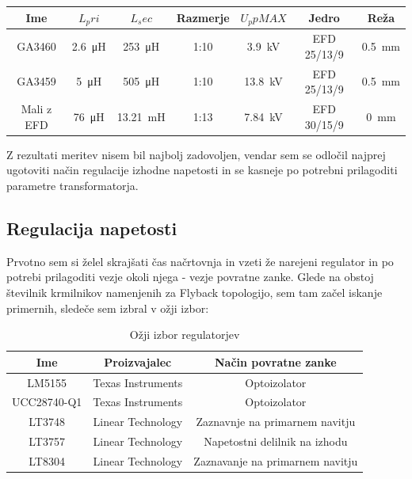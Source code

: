 \documentclass[a4paper,twoside,openright,12pt,slovene]{book}
\begin{document}
\begin{center}
\begin{tabular}{||c|c|c|c|c|c|c||}
\hline
Ime & \(L_pri\) & \(L_sec\) & Razmerje & \(U_ppMAX\) & Jedro & Reža \\ [0.5ex]
\hline\hline
GA3460 & \SI{2.6}{\micro\henry} & \SI{253}{\micro\henry} & 1:10 & \SI{3.9}{\kilo\volt} & EFD 25/13/9 & \SI{0.5}{\milli\meter} \\
\hline
GA3459 & \SI{5}{\micro\henry} & \SI{505}{\micro\henry} & 1:10 & \SI{13.8}{\kilo\volt} & EFD 25/13/9 & \SI{0.5}{\milli\meter} \\
\hline
Mali z EFD & \SI{76}{\micro\henry} & \SI{13.21}{\milli\henry} & 1:13 & \SI{7.84}{\kilo\volt} & EFD 30/15/9 & \SI{0}{\milli\meter} \\
\hline
\end{tabular}

\label{table:1}
\end{center}

Z rezultati meritev nisem bil najbolj zadovoljen, vendar sem se odločil najprej ugotoviti način regulacije izhodne napetosti in se kasneje po potrebni prilagoditi parametre transformatorja. 

	\subsection{Regulacija napetosti} \label{RegulacijaNapetosti}
	Prvotno sem si želel skrajšati čas načrtovnja in vzeti že narejeni regulator in po potrebi prilagoditi vezje okoli njega - vezje povratne zanke. Glede na obstoj številnik krmilnikov namenjenih za Flyback topologijo, sem tam začel iskanje primernih, sledeče sem izbral v ožji izbor:
	
\begin{table}[h!]
\centering
\begin{tabular}{||c | c |c||}
\hline
Ime & Proizvajalec & Način povratne zanke \\[0.5ex]
\hline\hline
LM5155 & Texas Instruments & Optoizolator \\
UCC28740-Q1 & Texas Instruments & Optoizolator \\
LT3748 & Linear Technology & Zaznavnje na primarnem navitju \\
LT3757 & Linear Technology & Napetostni delilnik na izhodu \\
LT8304 & Linear Technology & Zaznavanje na primarnem navitju \\ [1ex]

\hline
\end{tabular}
\caption{Ožji izbor regulatorjev}
\end{table}
\end{document}
